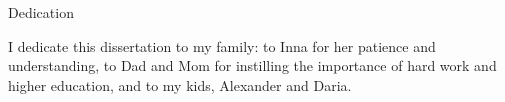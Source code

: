 \begin{dedication}

\begin{center}
{\Large Dedication }
\end{center}

I dedicate this dissertation to my family: to Inna for her patience and understanding, to Dad and Mom for instilling the importance of hard work and higher education, and to my kids, Alexander and Daria.

\end{dedication}
